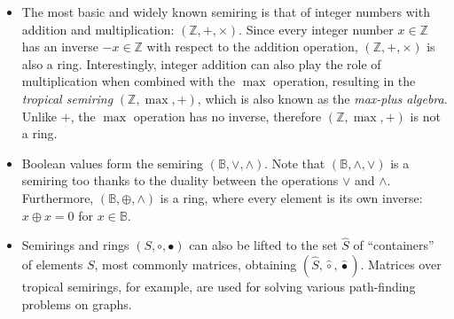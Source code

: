 \begin{itemize}
  \item The most basic and widely known semiring is that of integer numbers with
  addition and multiplication: $(\mathbb{Z}, +, \times)$. Since every integer
  number $x\in \mathbb{Z}$ has an inverse $-x \in \mathbb{Z}$ with respect to
  the addition operation, $(\mathbb{Z}, +, \times)$ is also a ring.
  Interestingly, integer addition can also play the role of multiplication when
  combined with the $\max$ operation, resulting in the \emph{tropical semiring}
  $(\mathbb{Z}, \max, +)$, which is also known as the \emph{max-plus algebra}.
  Unlike $+$, the $\max$ operation has no inverse, therefore
  $(\mathbb{Z}, \max, +)$ is not a ring.

  \item Boolean values form the semiring $(\mathbb{B}, \vee, \wedge)$. Note that
  $(\mathbb{B}, \wedge, \vee)$ is a semiring too thanks to the duality between
  the operations $\vee$ and $\wedge$. Furthermore,
  $(\mathbb{B}, \oplus, \wedge)$ is a ring, where every element is its own
  inverse: $x \oplus x = 0$ for $x \in \mathbb{B}$.

  \item Semirings and rings $(S, \circ, \bullet)$ can also be lifted to the set
  $\hat{S}$ of ``containers'' of elements $S$, most commonly matrices, obtaining
  $(\hat{S}, \hat{\circ}, \hat{\bullet})$. Matrices over tropical semirings, for
  example, are used for solving various path-finding problems on graphs.
\end{itemize}

